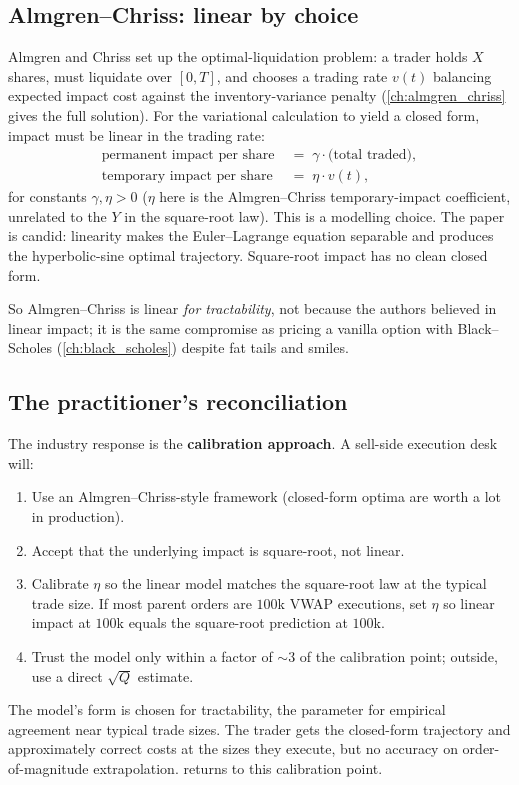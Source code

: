 \subsection{Almgren--Chriss: linear by choice}
\label{subsec:ac_linear_choice}

Almgren and Chriss \citeAC{} set up the optimal-liquidation problem:
a trader holds $X$ shares, must liquidate over $[0, T]$, and chooses
a trading rate $v(t)$ balancing expected impact cost against the
inventory-variance penalty (\cref{ch:almgren_chriss} gives the full
solution). For the variational calculation to yield a closed form,
impact must be linear in the trading rate:
\begin{align*}
  \text{permanent impact per share} \;&=\; \gamma \cdot \text{(total traded)},\\
  \text{temporary impact per share} \;&=\; \eta \cdot v(t),
\end{align*}
for constants $\gamma, \eta > 0$ ($\eta$ here is the Almgren--Chriss
temporary-impact coefficient, unrelated to the $Y$ in the square-root
law). This is a modelling choice. The paper is candid: linearity
makes the Euler--Lagrange equation separable and produces the
hyperbolic-sine optimal trajectory. Square-root impact has no clean
closed form.

So Almgren--Chriss is linear \emph{for tractability}, not because
the authors believed in linear impact; it is the same compromise as
pricing a vanilla option with Black--Scholes
(\cref{ch:black_scholes}) despite fat tails and smiles.

\subsection{The practitioner's reconciliation}
\label{subsec:practitioner_reconciliation}

The industry response is the \textbf{calibration approach}. A
sell-side execution desk will:
\begin{enumerate}
  \item Use an Almgren--Chriss-style framework (closed-form optima
  are worth a lot in production).
  \item Accept that the underlying impact is square-root, not linear.
  \item Calibrate $\eta$ so the linear model matches the square-root
  law at the typical trade size. If most parent orders are $100$k
  VWAP executions, set $\eta$ so linear impact at $100$k equals the
  square-root prediction at $100$k.
  \item Trust the model only within a factor of $\sim 3$ of the
  calibration point; outside, use a direct $\sqrt{Q}$ estimate.
\end{enumerate}
The model's form is chosen for tractability, the parameter for
empirical agreement near typical trade sizes. The trader gets the
closed-form trajectory and approximately correct costs at the sizes
they execute, but no accuracy on order-of-magnitude extrapolation.
 returns to this calibration point.

